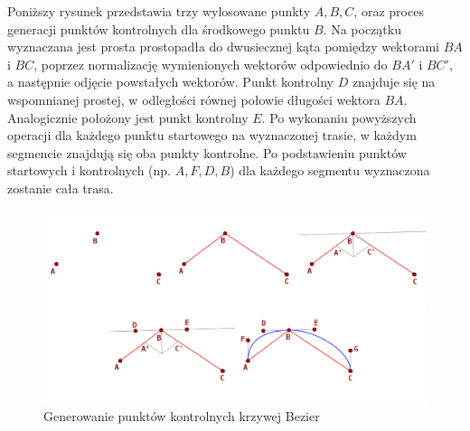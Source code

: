 Poniższy rysunek przedstawia trzy wylosowane punkty $A,B,C$, oraz proces generacji punktów kontrolnych dla środkowego punktu $B$. Na początku wyznaczana jest prosta prostopadła do dwusiecznej kąta pomiędzy wektorami $BA$ i $BC$, poprzez normalizację wymienionych wektorów odpowiednio do $BA'$ i $BC'$, a następnie odjęcie powstałych wektorów. Punkt kontrolny $D$ znajduje się na wspomnianej prostej, w odległości równej połowie długości wektora $BA$. Analogicznie położony jest punkt kontrolny $E$. Po wykonaniu powyższych operacji dla każdego punktu startowego na wyznaczonej trasie, w każdym segmencie znajdują się oba punkty kontrolne. Po podstawieniu punktów startowych i kontrolnych (np. $A,F,D,B$) dla każdego segmentu wyznaczona zostanie cała trasa.

\begin{figure}[h]
    \includegraphics[width=\textwidth]{figures/loop_creation}
    \caption{Generowanie punktów kontrolnych krzywej Bezier}
    \label{fig}
\end{figure}


